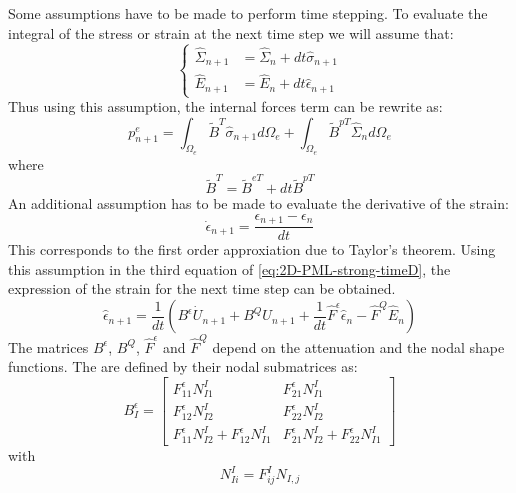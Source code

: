 Some assumptions have to be made to perform time stepping. To evaluate the integral of the stress or strain at the next time step we will assume that:
\begin{equation}
\begin{cases}
\hat{\Sigma}_{n+1} &= \hat{\Sigma}_n + dt \hat{\sigma}_{n+1} \\
\hat{E}_{n+1} &= \hat{E}_n + dt \hat{\epsilon}_{n+1}
\end{cases}
\end{equation}
Thus using this assumption, the internal forces term can be rewrite as:
\begin{equation}
p_{n+1}^e = \int_{\Omega_e} \tilde{B}^{T} \hat{\sigma}_{n+1} d\Omega_e + \int_{\Omega_e}\tilde{B}^{pT} \hat{\Sigma}_{n} d\Omega_e
\end{equation}
where
\begin{equation}
\tilde{B}^{T} = \tilde{B}^{eT} + dt \tilde{B}^{pT}
\end{equation}
An additional assumption has to be made to evaluate the derivative of the strain:
\begin{equation}
\dot{\epsilon}_{n+1} = \frac{\epsilon_{n+1}-\epsilon_n}{dt}
\end{equation} 
This corresponds to the first order approxiation due to Taylor's theorem.
Using this assumption in the third equation of \ref{eq:2D-PML-strong-timeD}, the expression of the strain for the next time step can be obtained.
\begin{equation}
\hat{\epsilon}_{n+1} = \frac{1}{dt}\left(B^\epsilon \dot{U}_{n+1} + B^Q U_{n+1} + \frac{1}{dt} \hat{F}^\epsilon \hat{\epsilon}_n - \hat{F}^Q \hat{E}_n\right)
\label{eq:strain-n+1}
\end{equation} 
The matrices $B^\epsilon$, $B^Q$, $\hat{F}^\epsilon$ and $\hat{F}^Q$ depend on the attenuation and the nodal shape functions. The are defined by their nodal submatrices as:
\begin{equation}
B^\epsilon_I = \begin{bmatrix}
F^\epsilon_{11}N^I_{I1}&F^\epsilon_{21}N^I_{I1}\\
F^\epsilon_{12}N^I_{I2}&F^\epsilon_{22}N^I_{I2}\\
F^\epsilon_{11}N^I_{I2}+F^\epsilon_{12}N^I_{I1}& F^\epsilon_{21}N^I_{I2}+F^\epsilon_{22}N^I_{I1}
\end{bmatrix}
\end{equation}
with
\begin{equation}
N^I_{Ii} = F^I_{ij}N_{I,j}
\end{equation}
